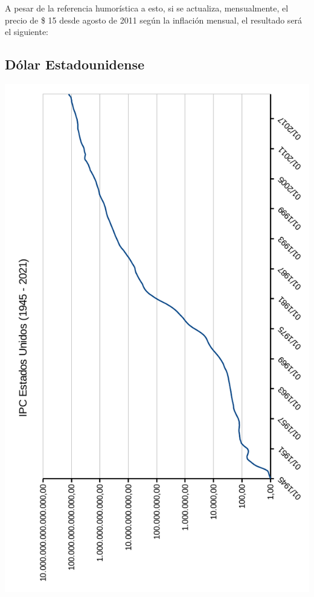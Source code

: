 \documentclass[12pt,a4paper,twoside]{book}
\begin{document}
A pesar de la referencia humorística a esto, si se actualiza, mensualmente, el precio de  \$ 15 desde agosto de 2011 según la inflación mensual, el resultado será el siguiente:


\newpage

\subsection{Dólar Estadounidense}


\newpage

\begin{center}
\includegraphics[scale=0.975]{img/ipc-historico-usa.pdf}
\end{center}
\newpage
\end{document}
